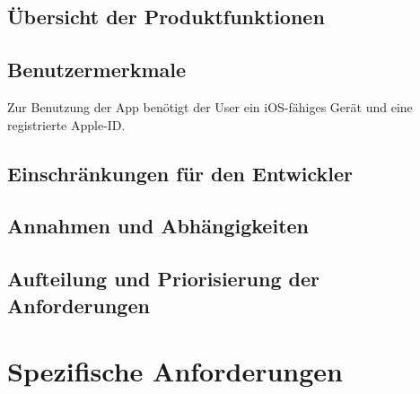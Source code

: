 \section{Übersicht der Produktfunktionen}
\section{Benutzermerkmale}
Zur Benutzung der App benötigt der User ein iOS-fähiges Gerät und eine registrierte Apple-ID.

\section{Einschränkungen für den Entwickler}
\section{Annahmen und Abhängigkeiten}
\section{Aufteilung und Priorisierung der Anforderungen}

\chapter{Spezifische Anforderungen}
